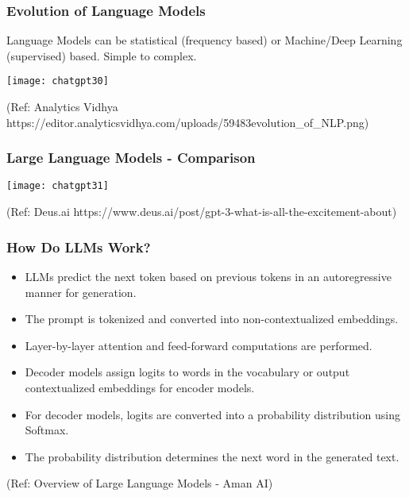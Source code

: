 \begin{frame}[fragile]\frametitle{Evolution of Language Models}

Language Models can be statistical (frequency based) or Machine/Deep Learning (supervised) based. Simple to complex.

\begin{center}
\texttt{[image: chatgpt30]}
\end{center}				
{\tiny (Ref: Analytics Vidhya https://editor.analyticsvidhya.com/uploads/59483evolution\_of\_NLP.png)}

\end{frame}

\begin{frame}[fragile]\frametitle{Large Language Models - Comparison}

\begin{center}
\texttt{[image: chatgpt31]}
\end{center}				
{\tiny (Ref: Deus.ai https://www.deus.ai/post/gpt-3-what-is-all-the-excitement-about)}

\end{frame}

\begin{frame}[fragile]\frametitle{How Do LLMs Work?}


\begin{itemize}
\item LLMs predict the next token based on previous tokens in an autoregressive manner for generation.
\item The prompt is tokenized and converted into non-contextualized embeddings.
\item Layer-by-layer attention and feed-forward computations are performed.
\item Decoder models assign logits to words in the vocabulary or output contextualized embeddings for encoder models.
\item For decoder models, logits are converted into a probability distribution using Softmax.
\item The probability distribution determines the next word in the generated text.
\end{itemize}

				
{\tiny (Ref: Overview of Large Language Models - Aman AI)}

\end{frame}

